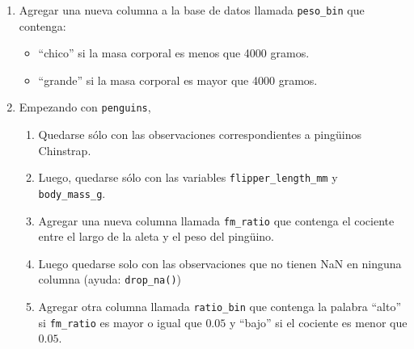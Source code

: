 \documentclass[a4paper,11pt]{article}
\theoremstyle{definition}
\begin{document}
\begin{enumerate}
\item Agregar una nueva columna a la base de datos llamada \lstinline{peso_bin} que contenga:
\begin{itemize}
\item ``chico'' si la masa corporal es menos que 4000 gramos.
\item ``grande'' si la masa corporal es mayor que 4000 gramos.
\end{itemize}

\item Empezando con \lstinline{penguins},

\begin{enumerate}
\item Quedarse sólo con las observaciones correspondientes a ping\"uinos Chinstrap.
\item Luego, quedarse sólo con las variables \lstinline{flipper_length_mm} y \lstinline{body_mass_g}.
\item Agregar una nueva columna llamada \lstinline{fm_ratio} que contenga el cociente entre el largo de la aleta y el peso del ping\"uino.
\item Luego quedarse solo con las observaciones que no tienen NaN en ninguna columna (ayuda: \lstinline{drop_na()})
\item Agregar otra columna llamada \lstinline{ratio_bin} que contenga la palabra ``alto'' si \lstinline{fm_ratio} es mayor o igual que $0.05$ y ``bajo'' si el cociente es menor que $0.05$.
\end{enumerate}

\end{enumerate}
\end{document}

